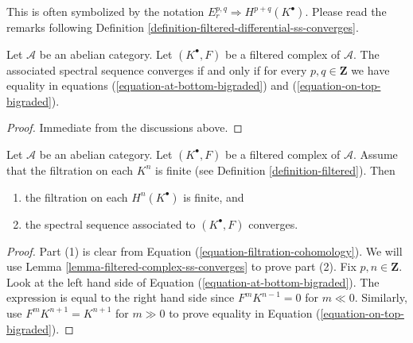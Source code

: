 \noindent
This is often symbolized by the notation
$E_r^{p, q} \Rightarrow H^{p + q}(K^\bullet)$.
Please read the remarks following
Definition \ref{definition-filtered-differential-ss-converges}.

\begin{lemma}
\label{lemma-filtered-complex-ss-converges}
Let $\mathcal{A}$ be an abelian category.
Let $(K^\bullet, F)$ be a filtered complex of $\mathcal{A}$.
The associated spectral sequence converges if and only if for every
$p, q \in \mathbf{Z}$ we have equality in equations
(\ref{equation-at-bottom-bigraded}) and (\ref{equation-on-top-bigraded}).
\end{lemma}

\begin{proof}
Immediate from the discussions above.
\end{proof}

\begin{lemma}
\label{lemma-biregular-ss-converges}
Let $\mathcal{A}$ be an abelian category.
Let $(K^\bullet, F)$ be a filtered complex of $\mathcal{A}$.
Assume that the filtration on each $K^n$ is finite
(see Definition \ref{definition-filtered}).
Then
\begin{enumerate}
\item the filtration on each $H^n(K^\bullet)$ is finite, and
\item the spectral sequence associated to $(K^\bullet, F)$ converges.
\end{enumerate}
\end{lemma}

\begin{proof}
Part (1) is clear from Equation (\ref{equation-filtration-cohomology}).
We will use Lemma \ref{lemma-filtered-complex-ss-converges} to prove
part (2). Fix $p, n \in \mathbf{Z}$. Look at the left hand side of
Equation (\ref{equation-at-bottom-bigraded}). The expression is
equal to the right hand side since $F^mK^{n - 1} = 0$ for
$m \ll 0$. Similarly, use $F^mK^{n + 1} = K^{n + 1}$ for
$m \gg 0$ to prove equality in Equation (\ref{equation-on-top-bigraded}).
\end{proof}

























